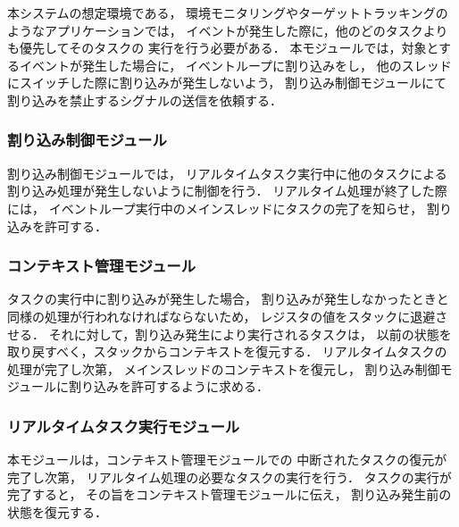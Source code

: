 \vspace{0.5em}本システムの想定環境である，
環境モニタリングやターゲットトラッキングのようなアプリケーションでは，
イベントが発生した際に，他のどのタスクよりも優先してそのタスクの
実行を行う必要がある．
本モジュールでは，対象とするイベントが発生した場合に，
イベントループに割り込みをし，
他のスレッドにスイッチした際に割り込みが発生しないよう，
割り込み制御モジュールにて割り込みを禁止するシグナルの送信を依頼する．


\subsubsection{割り込み制御モジュール}

\vspace{0.5em}割り込み制御モジュールでは，
リアルタイムタスク実行中に他のタスクによる
割り込み処理が発生しないように制御を行う．
リアルタイム処理が終了した際には，
イベントループ実行中のメインスレッドにタスクの完了を知らせ，
割り込みを許可する．


\subsubsection{コンテキスト管理モジュール}

\vspace{0.5em}タスクの実行中に割り込みが発生した場合，
割り込みが発生しなかったときと同様の処理が行われなければならないため，
レジスタの値をスタックに退避させる．
それに対して，割り込み発生により実行されるタスクは，
以前の状態を取り戻すべく，スタックからコンテキストを復元する．
リアルタイムタスクの処理が完了し次第，
メインスレッドのコンテキストを復元し，
割り込み制御モジュールに割り込みを許可するように求める．



\subsubsection{リアルタイムタスク実行モジュール}

\vspace{0.5em}本モジュールは，コンテキスト管理モジュールでの
中断されたタスクの復元が完了し次第，
リアルタイム処理の必要なタスクの実行を行う．
タスクの実行が完了すると，
その旨をコンテキスト管理モジュールに伝え，
割り込み発生前の状態を復元する．












